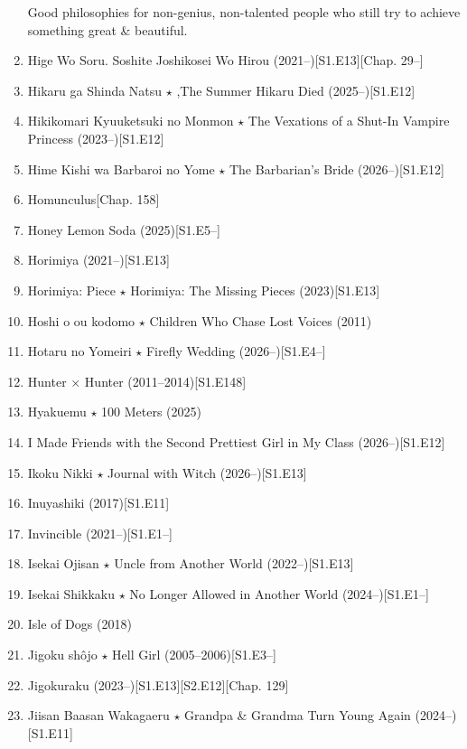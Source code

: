 \documentclass{article}
\begin{document}
\begin{enumerate}
    Good philosophies for non-genius, non-talented people who still try to achieve something great \& beautiful.
    \item {\sc Hige Wo Soru. Soshite Joshikosei Wo Hirou} (2021--)\hfill[S1.E13][Chap. 29--]
    \item {\sc Hikaru ga Shinda Natsu $\star$ ,The Summer Hikaru Died} (2025--)\hfill[S1.E12]
    \item {\sc Hikikomari Kyuuketsuki no Monmon $\star$ The Vexations of a Shut-In Vampire Princess} (2023--)\hfill[S1.E12]
    \item {\sc Hime Kishi wa Barbaroi no Yome $\star$ The Barbarian's Bride} (2026--)\hfill[S1.E12]
    \item {\sc Homunculus}\hfill[Chap. 158]
    \item Honey Lemon Soda (2025)\hfill[S1.E5--]
    \item {\sc Horimiya} (2021--)\hfill[S1.E13]
    \item {\sc Horimiya: Piece $\star$ Horimiya: The Missing Pieces} (2023)\hfill[S1.E13]
    \item {\sc Hoshi o ou kodomo $\star$ Children Who Chase Lost Voices} (2011)
    \item Hotaru no Yomeiri $\star$ Firefly Wedding (2026--)\hfill[S1.E4--]
    \item {\sc Hunter $\times$ Hunter} (2011--2014)\hfill[S1.E148]
    \item {\sc Hyakuemu $\star$ 100 Meters} (2025)
    \item I Made Friends with the Second Prettiest Girl in My Class (2026--)\hfill[S1.E12]
    \item {\sc Ikoku Nikki $\star$ Journal with Witch} (2026--)\hfill[S1.E13]
    \item {\sc Inuyashiki} (2017)\hfill[S1.E11]
    \item Invincible (2021--)\hfill[S1.E1--]
    \item Isekai Ojisan $\star$ Uncle from Another World (2022--)\hfill[S1.E13]
    \item Isekai Shikkaku $\star$ No Longer Allowed in Another World (2024--)\hfill[S1.E1--]
    \item {\sc Isle of Dogs} (2018)
    \item Jigoku shôjo $\star$ Hell Girl (2005--2006)\hfill[S1.E3--]
    \item {\sc Jigokuraku} (2023--)\hfill[S1.E13][S2.E12][Chap. 129]
    \item {\sc Jiisan Baasan Wakagaeru $\star$ Grandpa \& Grandma Turn Young Again} (2024--)\hfill[S1.E11]

\end{enumerate}
\end{document}
